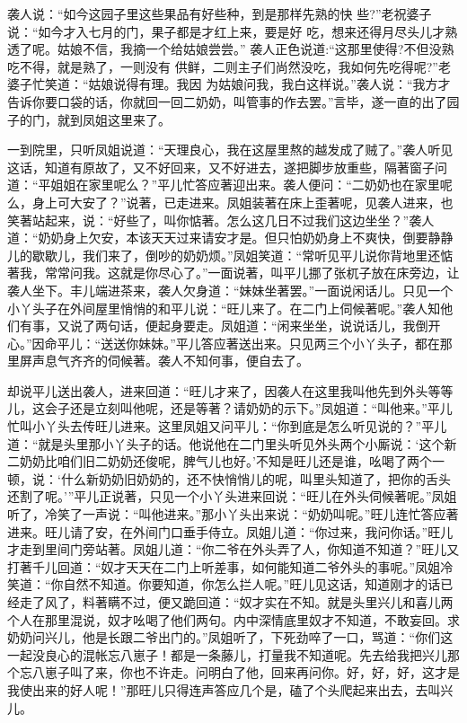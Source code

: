 \begin{parag}


    袭人说：“如今这园子里这些果品有好些种，到是那样先熟的快
    些?”老祝婆子说：“如今才入七月的门，果子都是才红上来，要是好
    吃，想来还得月尽头儿才熟透了呢。姑娘不信，我摘一个给姑娘尝尝。”
    袭人正色说道:“这那里使得?不但没熟吃不得，就是熟了，一则没有
    供鲜，二则主子们尚然没吃，我如何先吃得呢?”老婆子忙笑道：“姑娘说得有理。我因
    为姑娘问我，我白这样说。”袭人说：“我方才告诉你要口袋的话，你就回一回二奶奶，叫管事的作去罢。”言毕，遂一直的出了园子的门，就到凤姐这里来了。
\end{parag}


\begin{parag}


    一到院里，只听凤姐说道：“天理良心，我在这屋里熬的越发成了贼了。”袭人听见这话，知道有原故了，又不好回来，又不好进去，遂把脚步放重些，隔著窗子问道：“平姐姐在家里呢么？”平儿忙答应著迎出来。袭人便问：“二奶奶也在家里呢么，身上可大安了？”说著，已走进来。凤姐装著在床上歪著呢，见袭人进来，也笑著站起来，说：“好些了，叫你惦著。怎么这几日不过我们这边坐坐？”袭人道：“奶奶身上欠安，本该天天过来请安才是。但只怕奶奶身上不爽快，倒要静静儿的歇歇儿，我们来了，倒吵的奶奶烦。”凤姐笑道：“常听见平儿说你背地里还惦著我，常常问我。这就是你尽心了。”一面说著，叫平儿挪了张杌子放在床旁边，让袭人坐下。丰儿端进茶来，袭人欠身道：“妹妹坐著罢。”一面说闲话儿。只见一个小丫头子在外间屋里悄悄的和平儿说：“旺儿来了。在二门上伺候著呢。”袭人知他们有事，又说了两句话，便起身要走。凤姐道：“闲来坐坐，说说话儿，我倒开心。”因命平儿：“送送你妹妹。”平儿答应著送出来。只见两三个小丫头子，都在那里屏声息气齐齐的伺候著。袭人不知何事，便自去了。
\end{parag}


\begin{parag}


    却说平儿送出袭人，进来回道：“旺儿才来了，因袭人在这里我叫他先到外头等等儿，这会子还是立刻叫他呢，还是等著？请奶奶的示下。”凤姐道：“叫他来。”平儿忙叫小丫头去传旺儿进来。这里凤姐又问平儿：“你到底是怎么听见说的？”平儿道：“就是头里那小丫头子的话。他说他在二门里头听见外头两个小厮说：‘这个新二奶奶比咱们旧二奶奶还俊呢，脾气儿也好。’不知是旺儿还是谁，吆喝了两个一顿，说：‘什么新奶奶旧奶奶的，还不快悄悄儿的呢，叫里头知道了，把你的舌头还割了呢。’”平儿正说著，只见一个小丫头进来回说：“旺儿在外头伺候著呢。”凤姐听了，冷笑了一声说：“叫他进来。”那小丫头出来说：“奶奶叫呢。”旺儿连忙答应著进来。旺儿请了安，在外间门口垂手侍立。凤姐儿道：“你过来，我问你话。”旺儿才走到里间门旁站著。凤姐儿道：“你二爷在外头弄了人，你知道不知道？”旺儿又打著千儿回道：“奴才天天在二门上听差事，如何能知道二爷外头的事呢。”凤姐冷笑道：“你自然不知道。你要知道，你怎么拦人呢。”旺儿见这话，知道刚才的话已经走了风了，料著瞒不过，便又跪回道：“奴才实在不知。就是头里兴儿和喜儿两个人在那里混说，奴才吆喝了他们两句。内中深情底里奴才不知道，不敢妄回。求奶奶问兴儿，他是长跟二爷出门的。”凤姐听了，下死劲啐了一口，骂道：“你们这一起没良心的混帐忘八崽子！都是一条藤儿，打量我不知道呢。先去给我把兴儿那个忘八崽子叫了来，你也不许走。问明白了他，回来再问你。好，好，好，这才是我使出来的好人呢！”那旺儿只得连声答应几个是，磕了个头爬起来出去，去叫兴儿。
\end{parag}


